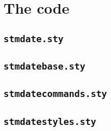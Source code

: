 \documentclass[%
  type=article,%
  layout=koma,%
  date=false,%
  hyperref=true,%
  listings=true%
]{stmtext}
\begin{document}
\newpage
\appendix

\section{The code}

\subsection{\protect\texttt{stmdate.sty}}



\subsection{\protect\texttt{stmdatebase.sty}}



\newpage
\subsection{\protect\texttt{stmdatecommands.sty}}



\newpage
\subsection{\protect\texttt{stmdatestyles.sty}}


\end{document}

